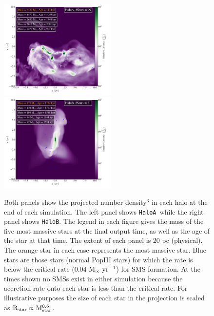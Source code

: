 \documentclass[graphics, twocolumn, usenatbib]{mn2e}
\newcommand{\msolaryrc} {$\rm{M_{\odot}~yr^{-1}}$}
\newcommand{\ha} {\texttt{HaloA~}}
\newcommand{\hbc} {\texttt{HaloB}}
\begin{document}
\begin{figure}
\centering
\begin{minipage}{175mm}      \begin{center} 
\centerline{
\includegraphics[width=0.52\textwidth]{FIGURES/HaloA/Proj_z_number_density_2001.pdf}
\includegraphics[width=0.52\textwidth]{FIGURES/HaloB/Proj_z_number_density_1844.pdf}}
\caption{Both panels show the projected number density$^3$ in each halo at the end of each
  simulation. The left panel shows \ha while the right panel shows \hbc.
  The legend in each figure gives the mass of the five most massive stars at the final output
  time, as well as
  the age of the star at that time. The extent of each panel is 20 pc (physical). The orange
  star in each case represents the most massive star. Blue stars are those stars
  (normal PopIII stars) for which the rate is below the critical rate (0.04 \msolaryrc) for
  SMS formation. At the times shown no
  SMSs exist in either simulation because the accretion rate onto each star is less than the
  critical rate.  For illustrative purposes the size of each star in the
  projection is scaled as $\rm{R_{star}} \propto \rm{M_{star}^{0.6}}$.}  \label{Fig:ProjectionEnd}
\end{center} \end{minipage}

\end{figure}
\end{document}
